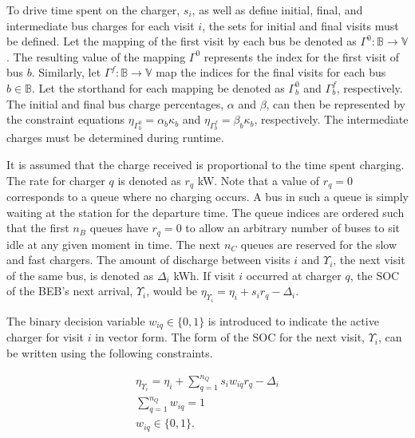 \documentclass[utf8]{FrontiersinHarvard}
\begin{document}
To drive time spent on the charger, \(s_i\), as well as define initial, final, and intermediate bus charges for each visit
\(i\), the sets for initial and final visits must be defined. Let the mapping of the first visit by each bus be denoted as
\(\Gamma^0 : \mathbb{B} \rightarrow \mathbb{V}\). The resulting value of the mapping \(\Gamma^0\) represents the index for the first visit of
bus \(b\). Similarly, let \(\Gamma^f : \mathbb{B} \rightarrow \mathbb{V}\) map the indices for the final visits for each bus \(b \in
\mathbb{B}\). Let the storthand for each mapping be denoted as \(\Gamma^0_b\) and \(\Gamma^f_b\), respectively. The initial and final
bus charge percentages, \(\alpha\) and \(\beta\), can then be represented by the constraint equations \(\eta_{\Gamma^0_b} = \alpha_b \kappa_{b}\) and
\(\eta_{\Gamma^f_b} = \beta_b \kappa_{b}\), respectively. The intermediate charges must be determined during runtime.

It is assumed that the charge received is proportional to the time spent charging. The rate for charger \(q\) is denoted
as \(r_q\) kW. Note that a value of \(r_q = 0\) corresponds to a queue where no charging occurs. A bus in such a queue is
simply waiting at the station for the departure time. The queue indices are ordered such that the first \(n_B\) queues
have \(r_q = 0\) to allow an arbitrary number of buses to sit idle at any given moment in time. The next \(n_C\) queues are
reserved for the slow and fast chargers. The amount of discharge between visits \(i\) and \(\Upsilon_i\), the next visit of the
same bus, is denoted as \(\Delta_i\) kWh. If visit \(i\) occurred at charger \(q\), the SOC of the BEB's next arrival, \(\Upsilon_i\), would
be \(\eta_{\Upsilon_i} = \eta_i + s_i r_q - \Delta_i\).

The binary decision variable \(w_{iq} \in \{0,1\}\) is introduced to indicate the active charger for visit \(i\) in vector
form. The form of the SOC for the next visit, \(\Upsilon_i\), can be written using the following constraints.

\begin{subequations}
    \label{subeq:pre_next_charge}
\begin{align}
    \eta_{\Upsilon_i} = \eta_i + \sum_{q=1}^{n_Q} s_i w_{iq} r_q - \Delta_i \\
    \sum_{q=1}^{n_Q} w_{iq} = 1                           \\
    w_{iq} \in \{0,1\}.
\end{align}
\end{subequations}
\end{document}
